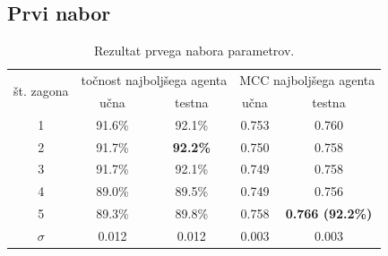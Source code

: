 \subsection{Prvi nabor}\label{subsec:dodatek-statlog-prvi-nabor}
\begin{table}[H]
    \begin{center}
        \begin{tabular}{|| c | c c || c c ||}
            \hline
            \multirow{2}{*}{št. zagona} & \multicolumn{2}{c||}{točnost najboljšega agenta} & \multicolumn{2}{c||}{MCC najboljšega agenta} \\ \cline{2-5}
            & učna   & testna          & učna  & testna                  \\
            \hline
            1        & 91.6\% & 92.1\%          & 0.753 & 0.760                   \\
            \hline
            2        & 91.7\% & \textbf{92.2\%} & 0.750 & 0.758                   \\
            \hline
            3        & 91.7\% & 92.1\%          & 0.749 & 0.758                   \\
            \hline
            4        & 89.0\% & 89.5\%          & 0.749 & 0.756                   \\
            \hline
            5        & 89.3\% & 89.8\%          & 0.758 & \textbf{0.766 (92.2\%)} \\
            \hline
            $\sigma$ & 0.012  & 0.012           & 0.003 & 0.003                   \\
            \hline
        \end{tabular}
    \end{center}
    \caption{Rezultat prvega nabora parametrov.}
    \label{tab:statlog_result_1}
\end{table}

